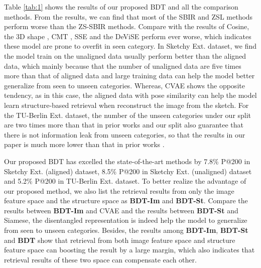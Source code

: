 \documentclass[10pt,twocolumn,letterpaper]{article}
\begin{document}
Table \ref{tab:1} shows the results of our proposed BDT and all the comparison methods. 
From the results, we can find that most of the SBIR and ZSL methods perform worse than the ZS-SBIR methods. 
Compare with the results of Cosine, the 3D shape \cite{wang2015sketch}, CMT \cite{socher2013zero}, SSE \cite{zhang2015bit} and the DeViSE \cite{frome2013devise} perform ever worse, which indicates these model are prone to overfit in seen category. 
In Sketchy Ext. dataset, we find the model train on the unaligned data usually perform better than the aligned data, which mainly because that the number of unaligned data are five times more than that of aligned data and large training data can help the model better generalize from seen to unseen categories. 
Whereas, CVAE shows the opposite tendency, as in this case, the aligned data with pose similarity can help the model learn structure-based retrieval when reconstruct the image from the sketch. 
For the TU-Berlin Ext. dataset, the number of the unseen categories under our split are two times more than that in prior works \cite{liu2019semantic, dutta2019semantically} and our split also guarantee that there is not information leak from unseen categories, so that the results in our paper is much more lower than that in prior works \cite{liu2019semantic, dutta2019semantically}.

Our proposed BDT has excelled the state-of-the-art methods by 7.8\% P@200 in Sketchy Ext. (aligned) dataset, 8.5\% P@200 in Sketchy Ext. (unaligned) dataset and 5.2\% P@200 in TU-Berlin Ext. dataset. 
To better realize the advantage of our proposed method, we also list the retrieval results from only the image feature space and the structure space as \textbf{BDT-Im} and \textbf{BDT-St}. Compare the results between \textbf{BDT-Im} and CVAE and the results between \textbf{BDT-St} and Siamese, the disentangled representation is indeed help the model to generalize from seen to unseen categories. 
Besides, the results among \textbf{BDT-Im}, \textbf{BDT-St} and \textbf{BDT} show that retrieval from both image feature space and structure feature space can boosting the result by a large margin, which also indicates that retrieval results of these two space can compensate each other.
\end{document}
